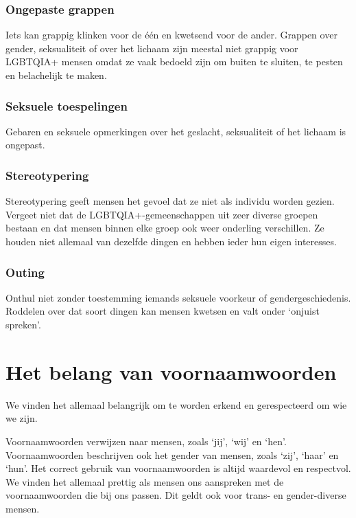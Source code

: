 \documentclass[12pt,openany]{book}
\begin{document}
\subsubsection*{Ongepaste grappen} 

Iets kan grappig klinken voor de één en kwetsend voor de ander. Grappen over gender, seksualiteit of over het lichaam zijn meestal niet grappig voor LGBTQIA+ mensen omdat ze vaak bedoeld zijn om buiten te sluiten, te pesten en belachelijk te maken. 

\subsubsection*{Seksuele toespelingen}

Gebaren en seksuele opmerkingen over het geslacht, seksualiteit of het lichaam is ongepast.

\subsubsection*{Stereotypering}

Stereotypering geeft mensen het gevoel dat ze niet als individu worden gezien. Vergeet niet dat de LGBTQIA+-gemeenschappen uit zeer diverse groepen bestaan en dat mensen binnen elke groep ook weer onderling verschillen. Ze houden niet allemaal van dezelfde dingen en hebben ieder hun eigen interesses. 

\subsubsection*{Outing}

Onthul niet zonder toestemming iemands seksuele voorkeur of gendergeschiedenis. Roddelen over dat soort dingen kan mensen kwetsen en valt onder `onjuist spreken'.

\section*{Het belang van voornaamwoorden}

We vinden het allemaal belangrijk om te worden erkend en gerespecteerd om wie we zijn.

Voornaamwoorden verwijzen naar mensen, zoals `jij', `wij' en `hen'. Voornaamwoorden beschrijven ook het gender van mensen, zoals `zij', `haar' en `hun'. Het correct gebruik van voornaamwoorden is altijd waardevol en respectvol. We vinden het allemaal prettig als mensen ons aanspreken met de voornaamwoorden die bij ons passen. Dit geldt ook voor trans- en gender-diverse mensen. 
\end{document}
